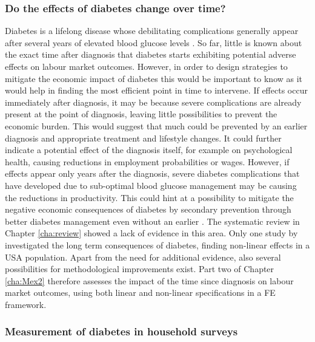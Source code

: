 \subsubsection{Do the effects of diabetes change over time?}

Diabetes is a lifelong disease whose debilitating complications generally appear after several years of elevated blood glucose levels \parencite{WorldHealthOrganization2016}. So far, little is known about the exact time after diagnosis that diabetes starts exhibiting potential adverse effects on labour market outcomes. However, in order to design strategies to mitigate the economic impact of diabetes this would be important to know as it would help in finding the most efficient point in time to intervene. If effects occur immediately after diagnosis, it may be because severe complications are already present at the point of diagnosis, leaving little possibilities to prevent the economic burden. This would suggest that much could be prevented by an earlier diagnosis and appropriate treatment and lifestyle changes. It could further indicate a potential effect of the diagnosis itself, for example on psychological health, causing reductions in employment probabilities or wages. However, if effects appear only years after the diagnosis, severe diabetes complications that have developed due to sub-optimal blood glucose management may be causing the reductions in productivity. This could hint at a possibility to mitigate the negative economic consequences of diabetes by secondary prevention through better diabetes management \DIFdelbegin \DIFdel{, }\DIFdelend even without an earlier \DIFdelbegin {}\DIFdelend \DIFaddbegin {}\DIFaddend . The systematic review in Chapter \ref{cha:review} showed a lack of evidence in this area. Only one study by \textcite{Minor2013} investigated the long term consequences of diabetes, finding non-linear effects in a USA population. Apart from the need for additional evidence, also several possibilities for methodological improvements exist. Part two of Chapter \ref{cha:Mex2} therefore assesses the impact of the time since diagnosis on labour market outcomes, using both linear and non-linear specifications in a \ac{FE} framework. 

\subsubsection{Measurement of diabetes in household surveys}

